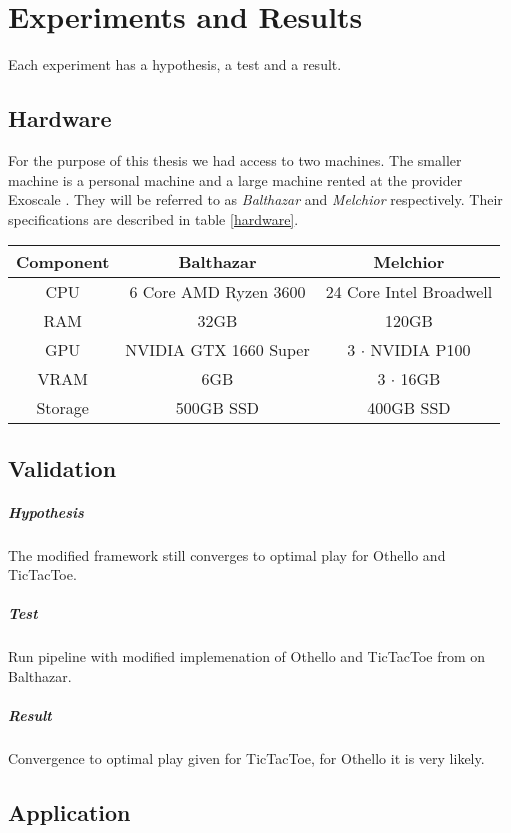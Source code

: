 \chapter{Experiments and Results}
\label{experiments-and-results}

Each experiment has a hypothesis, a test and a result.

\section{Hardware}
For the purpose of this thesis we had access to two machines. The smaller machine is a personal machine and a large machine rented at the provider Exoscale \cite{noauthor_exoscale_nodate}. They will be referred to as \textit{Balthazar} and \textit{Melchior} respectively. Their specifications are described in table \ref{hardware}.

\begin{table*}
    \begin{center}
        \begin{tabular}{ c|c|c }
            Component & Balthazar             & Melchior                \\
            \hline
            \hline
            CPU       & 6 Core AMD Ryzen 3600 & 24 Core Intel Broadwell \\
            RAM       & 32GB                  & 120GB                   \\
            GPU       & NVIDIA GTX 1660 Super & 3 $\cdot$ NVIDIA P100   \\
            VRAM      & 6GB                   & 3 $\cdot$ 16GB          \\
            Storage   & 500GB SSD             & 400GB SSD               \\
        \end{tabular}
    \end{center}
    \caption{Hardware specifications of the utilized machines}
    \label{hardware}
\end{table*}

\section{Validation}
\paragraph{Hypothesis} The modified framework still converges to optimal play for Othello and TicTacToe.
\paragraph{Test} Run pipeline with modified implemenation of Othello and TicTacToe from \cite{thakoor_suragnairalpha-zero-general_nodate} on Balthazar.
\paragraph{Result} Convergence to optimal play given for TicTacToe, for Othello it is very likely.

\section{Application}
